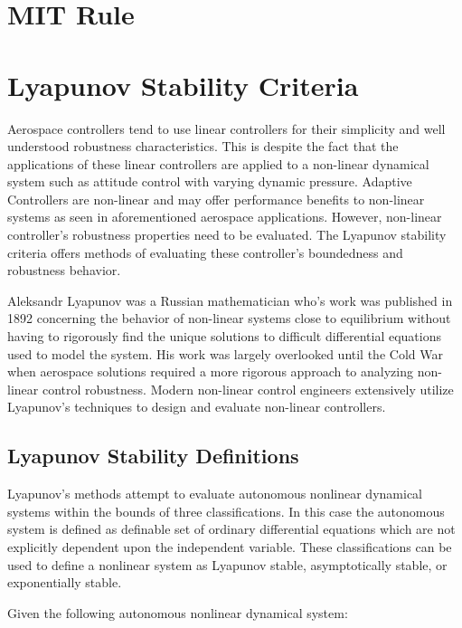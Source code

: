\section{MIT Rule}


\section{Lyapunov Stability Criteria}

Aerospace controllers tend to use linear controllers for their simplicity and well understood robustness characteristics.  This is despite the fact that the applications of these linear controllers are applied to a non-linear dynamical system such as attitude control with varying dynamic pressure.  Adaptive Controllers are non-linear and may offer performance benefits to non-linear systems as seen in aforementioned aerospace applications.  However, non-linear controller's robustness properties need to be evaluated.  The Lyapunov stability criteria offers methods of evaluating these controller's boundedness and robustness behavior.  

Aleksandr Lyapunov was a Russian mathematician who's work was published in 1892 \cite{lyapunov1892general} concerning the behavior of non-linear systems close to equilibrium without having to rigorously find the unique solutions to difficult differential equations used to model the system.  His work was largely overlooked until the Cold War when aerospace solutions required a more rigorous approach to analyzing non-linear control robustness.  Modern non-linear control engineers extensively utilize Lyapunov's techniques to design and evaluate non-linear controllers.

\subsection{Lyapunov Stability Definitions}

Lyapunov's methods attempt to evaluate autonomous nonlinear dynamical systems within the bounds of three classifications.  In this case the autonomous system is defined as definable set of ordinary differential equations which are not explicitly dependent upon the independent variable.  These classifications can be used to define a nonlinear system as Lyapunov stable, asymptotically stable, or exponentially stable.

Given the following autonomous nonlinear dynamical system:

